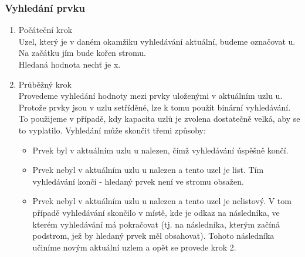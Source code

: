 \documentclass[10pt,a4paper]{article}
\begin{document}
\subsubsection{Vyhledání prvku}
\begin{enumerate}
	\item Počáteční krok \\
	Uzel, který je v daném okamžiku vyhledávání aktuální, budeme označovat u. Na začátku jím bude kořen stromu. \\
	Hledaná hodnota nechť je x.
	\item Průběžný krok \\
	Provedeme vyhledání hodnoty mezi prvky uloženými v aktuálním uzlu u. Protože prvky jsou v uzlu setříděné, lze k tomu použít binární vyhledávání. To použijeme v případě, kdy kapacita uzlů je zvolena dostatečně velká, aby se to vyplatilo. Vyhledání může skončit třemi způsoby:
	\begin{itemize}
		\item Prvek byl v aktuálním uzlu u nalezen, čímž vyhledávání úspěšně končí.
		\item Prvek nebyl v aktuálním uzlu u nalezen a tento uzel je list. Tím vyhledávání končí - hledaný prvek není ve stromu obsažen.
		\item Prvek nebyl v aktuálním uzlu u nalezen a tento uzel je nelistový. V tom případě vyhledávání skončilo v místě, kde je odkaz na následníka, ve kterém vyhledávání má pokračovat (tj. na následníka, kterým začíná podstrom, jež by hledaný prvek měl obsahovat). Tohoto následníka učiníme novým aktuální uzlem a opět se provede krok 2.
	\end{itemize}
\end{enumerate}
\end{document}
